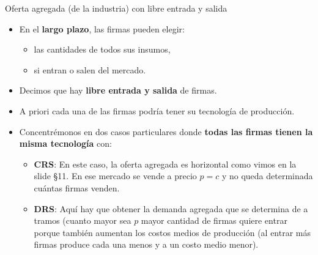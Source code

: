 \documentclass{beamer}
\theoremstyle{definition}
\begin{document}
\begin{frame}{Oferta agregada (de la industria) con libre entrada y salida}
    \begin{itemize}
        \item En el \textbf{largo plazo}, las firmas pueden elegir:
        \begin{itemize}
            \item las cantidades de todos sus insumos,
            \item si entran o salen del mercado.
        \end{itemize}
        
        \item Decimos que hay \textbf{libre entrada y salida} de firmas.

       \item A priori cada una de las firmas podría tener su tecnología de producción.
       \item Concentrémonos en dos casos particulares donde \textbf{todas las firmas tienen la misma tecnología} con:
       \begin{itemize}
           \item \textbf{CRS}: En este caso, la oferta agregada es horizontal como vimos en la slide \S11. En ese mercado se vende a precio $p=c$ y no queda determinada cuántas firmas venden.
           \item \textbf{DRS}: Aquí hay que obtener la demanda agregada que se determina de a tramos (cuanto mayor sea $p$ mayor cantidad de firmas quiere entrar porque también aumentan los costos medios de producción (al entrar más firmas produce cada una menos y a un costo medio menor).
       \end{itemize}
    \end{itemize}
\end{frame}
\end{document}
